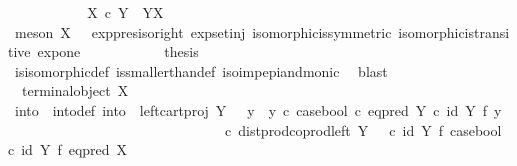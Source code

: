 \begin{isabellebody}
\ \ \ \ \ \ \ \ \isamarkupfalse%
\ \isamarkupfalse%
\ {\isachardoublequoteopen}X\ {\isasymtimes}\isactrlsub c\ Y\ {\isasymcong}\ Y\isactrlbsup X\isactrlesup {\isachardoublequoteclose}\isanewline
\ \ \ \ \ \ \ \ \ \ \isamarkupfalse%
\ {\isacharparenleft}{\kern0pt}meson\ {\isacartoucheopen}X\ {\isasymcong}\ {\isasymone}{\isacartoucheclose}\ exp{\isacharunderscore}{\kern0pt}pres{\isacharunderscore}{\kern0pt}iso{\isacharunderscore}{\kern0pt}right\ exp{\isacharunderscore}{\kern0pt}set{\isacharunderscore}{\kern0pt}inj\ isomorphic{\isacharunderscore}{\kern0pt}is{\isacharunderscore}{\kern0pt}symmetric\ isomorphic{\isacharunderscore}{\kern0pt}is{\isacharunderscore}{\kern0pt}transitive\ exp{\isacharunderscore}{\kern0pt}one{\isacharparenright}{\kern0pt}\isanewline
\ \ \ \ \ \ \ \ \isamarkupfalse%
\ \isamarkupfalse%
\ {\isacharquery}{\kern0pt}thesis\isanewline
\ \ \ \ \ \ \ \ \ \ \isamarkupfalse%
\ is{\isacharunderscore}{\kern0pt}isomorphic{\isacharunderscore}{\kern0pt}def\ is{\isacharunderscore}{\kern0pt}smaller{\isacharunderscore}{\kern0pt}than{\isacharunderscore}{\kern0pt}def\ iso{\isacharunderscore}{\kern0pt}imp{\isacharunderscore}{\kern0pt}epi{\isacharunderscore}{\kern0pt}and{\isacharunderscore}{\kern0pt}monic\ \isamarkupfalse%
\ blast\isanewline
\ \ \ \ \ \ \isamarkupfalse%
\isanewline
\ \ \ \ \ \ \ \ \isamarkupfalse%
\ {\isachardoublequoteopen}{\isasymnot}\ terminal{\isacharunderscore}{\kern0pt}object\ X{\isachardoublequoteclose}\isanewline
\isanewline
\ \ \ \ \ \ \ \ \isamarkupfalse%
\ into\ \ into{\isacharunderscore}{\kern0pt}def{\isacharcolon}{\kern0pt}\ {\isachardoublequoteopen}into\ {\isacharequal}{\kern0pt}\ {\isacharparenleft}{\kern0pt}left{\isacharunderscore}{\kern0pt}cart{\isacharunderscore}{\kern0pt}proj\ Y\ {\isasymone}\ {\isasymamalg}\ {\isacharparenleft}{\kern0pt}{\isacharparenleft}{\kern0pt}y{}\ {\isasymamalg}\ y{}{\isacharparenright}{\kern0pt}\ {\isasymcirc}\isactrlsub c\ case{\isacharunderscore}{\kern0pt}bool\ {\isasymcirc}\isactrlsub c\ eq{\isacharunderscore}{\kern0pt}pred\ Y\ {\isasymcirc}\isactrlsub c\ {\isacharparenleft}{\kern0pt}id\ Y\ {\isasymtimes}\isactrlsub f\ y{}{\isacharparenright}{\kern0pt}{\isacharparenright}{\kern0pt}{\isacharparenright}{\kern0pt}\ \isanewline
\ \ \ \ \ \ \ \ \ \ \ \ \ \ \ \ \ \ \ \ \ \ \ \ \ \ \ \ \ \ \ {\isasymcirc}\isactrlsub c\ dist{\isacharunderscore}{\kern0pt}prod{\isacharunderscore}{\kern0pt}coprod{\isacharunderscore}{\kern0pt}left\ Y\ {\isasymone}\ {\isasymone}\ {\isasymcirc}\isactrlsub c\ {\isacharparenleft}{\kern0pt}id\ Y\ {\isasymtimes}\isactrlsub f\ case{\isacharunderscore}{\kern0pt}bool{\isacharparenright}{\kern0pt}\ {\isasymcirc}\isactrlsub c\ {\isacharparenleft}{\kern0pt}id\ Y\ {\isasymtimes}\isactrlsub f\ eq{\isacharunderscore}{\kern0pt}pred\ X{\isacharparenright}{\kern0pt}\ {\isachardoublequoteclose}\isanewline

\end{isabellebody}
